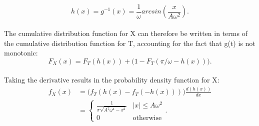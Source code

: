 \documentclass[12pt]{article}
\begin{document}
\begin{appendix}
    \begin{equation}
      h(x) = g^{-1}(x) = \frac{1}{\omega} arcsin \left(\frac{x}{A\omega^2}\right).
    \end{equation}
    \\
    The cumulative distribution function for X can therefore be written in terms of the cumulative distribution function for T, accounting for the fact that g(t) is not monotonic:
    \begin{equation}
      F_X(x) = F_T(h(x)) + \Big(1 - F_T(\pi/\omega - h(x))\Big).
    \end{equation}
    \\
    Taking the derivative results in the probability density function for X:
    \begin{align}
      f_X(x) & = \Big(f_T(h(x) - f_T(-h(x)))\Big) \frac{d(h(x))}{dx}\\
      & =
      \begin{cases}
        \frac{1}{\pi \sqrt{A^2 \omega^4 - x^2}} & |x| \leq A \omega^2\\
        0 & \text{otherwise}
      \end{cases}.
    \end{align}

\end{appendix}
\end{document}

